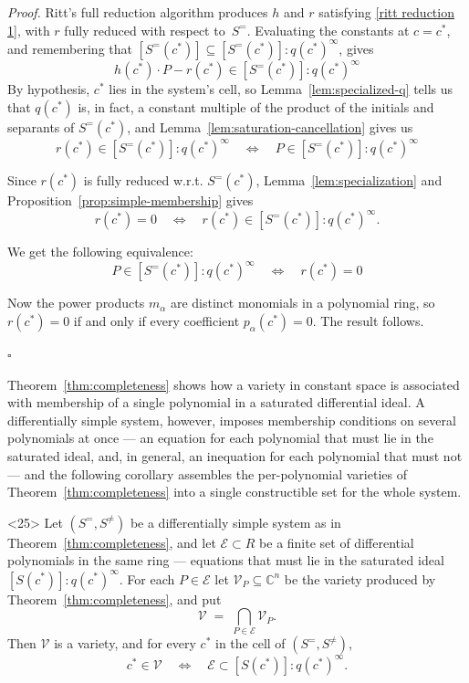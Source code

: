 \documentclass{article}
\theoremstyle{definition}
\theoremstyle{plain}
\newcommand{\qedbox}{\hspace*{\fill}\ensuremath{\square}}
\begin{document}
{\it Proof.}
Ritt's full reduction algorithm produces $h$ and $r$ satisfying \eqref{ritt reduction 1}, with
$r$ fully reduced with respect to~$S^=$.
Evaluating the constants at $c = c^*$,
and remembering that $[S^=(c^*)] \subseteq [S^=(c^*)]:q(c^*)^\infty$, gives
%
\[
h(c^*) \cdot P - r(c^*) \in [S^=(c^*)]:q(c^*)^\infty
\]
%
By hypothesis, $c^*$ lies in the system's cell, so Lemma~\ref{lem:specialized-q} tells us that $q(c^*)$
is, in fact, a constant multiple of the product of the initials and separants of $S^=(c^*)$, and
Lemma~\ref{lem:saturation-cancellation} gives us
%
\[
r(c^*) \in [S^=(c^*)]:q(c^*)^\infty
\quad\Longleftrightarrow\quad
P \in [S^=(c^*)]:q(c^*)^\infty
\]
%

Since $r(c^*)$ is fully reduced w.r.t. $S^=(c^*)$, Lemma~\ref{lem:specialization} and Proposition~\ref{prop:simple-membership} gives
%
\[
r(c^*) = 0
\quad\Longleftrightarrow\quad
r(c^*) \in [S^=(c^*)] : q(c^*)^\infty .
\]
%

We get the following equivalence:
%
\[
P \in [S^=(c^*)]:q(c^*)^\infty
\quad\Longleftrightarrow\quad
r(c^*) = 0
\]

Now the power products $m_{\alpha}$ are distinct monomials in a polynomial
ring, so $r(c^*) = 0$ if and only
if every coefficient $p_{\alpha}(c^*) = 0$.  The result follows.

\qedbox

\medskip
Theorem~\ref{thm:completeness} shows how a variety in constant space is
associated with membership of a single polynomial in a saturated differential
ideal.  A differentially simple system, however, imposes membership
conditions on several polynomials at once --- an equation for each
polynomial that must lie in the saturated ideal, and, in general, an
inequation for each polynomial that must not --- and the following
corollary assembles the per-polynomial varieties of
Theorem~\ref{thm:completeness} into a single constructible set for the whole
system.

\medskip
\begin{corollary}<25>
\label{cor:system-locus}
Let $(S^=, S^{\ne})$ be a differentially simple system as in
Theorem~\ref{thm:completeness}, and let $\mathcal{E} \subset R$ be a finite set
of differential polynomials in the same ring --- equations that must lie in the
saturated ideal $[S(c^*)] : q(c^*)^\infty$.  For each $P \in \mathcal{E}$ let
$\mathcal{V}_P \subseteq \mathbb{C}^n$ be the variety produced by
Theorem~\ref{thm:completeness}, and put
%
\[
\mathcal{V} \;=\; \bigcap_{P \in \mathcal{E}} \mathcal{V}_P .
\]
%
Then $\mathcal{V}$ is a variety, and for every $c^*$ in the cell of
$(S^=, S^{\ne})$,
%
\[
c^* \in \mathcal{V}
\quad\Longleftrightarrow\quad
\mathcal{E} \subset [S(c^*)] : q(c^*)^\infty .
\]
\end{corollary}
\end{document}
